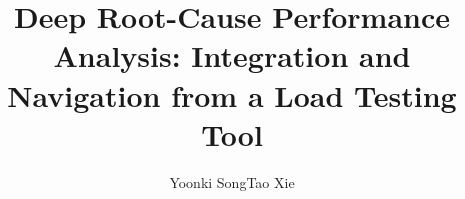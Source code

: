 \documentclass{sig-alternate}
\begin{document}
\title{Deep Root-Cause Performance Analysis: Integration and Navigation from a Load Testing Tool}

\author{
Yoonki Song\hspace*{0.3in}Tao Xie\\
       \\
       \\
       \textit{}
}

\maketitle



%
\end{document}
